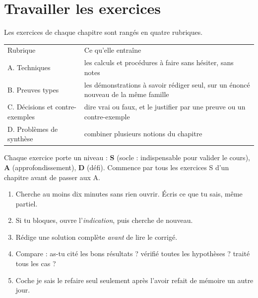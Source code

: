 \section{Travailler les exercices}
Les exercices de chaque chapitre sont rangés en quatre rubriques.
\begin{tabular}{ll}
Rubrique & Ce qu'elle entraîne \\
A. Techniques & les calculs et procédures à faire sans hésiter, sans notes \\
B. Preuves types & les démonstrations à savoir rédiger seul, sur un énoncé nouveau de la même famille \\
C. Décisions et contre-exemples & dire vrai ou faux, et le justifier par une preuve ou un contre-exemple \\
D. Problèmes de synthèse & combiner plusieurs notions du chapitre \\
\end{tabular}
Chaque exercice porte un niveau : \textbf{S} (socle : indispensable pour valider le cours), \textbf{A} (approfondissement), \textbf{D} (défi). Commence par tous les exercices S d'un chapitre avant de passer aux A.

\begin{methode}
\begin{enumerate}
\item Cherche au moins dix minutes sans rien ouvrir. Écris ce que tu sais, même partiel.
\item Si tu bloques, ouvre l'\emph{indication}, puis cherche de nouveau.
\item Rédige une solution complète \emph{avant} de lire le corrigé.
\item Compare : as-tu cité les bons résultats ? vérifié toutes les hypothèses ? traité tous les cas ?
\item Coche \og je sais le refaire seul \fg{} seulement après l'avoir refait de mémoire un autre jour.
\end{enumerate}
\end{methode}

